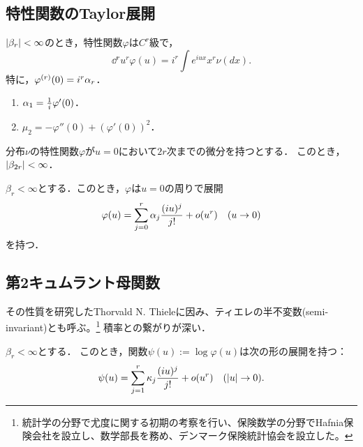 \documentclass[uplatex,dvipdfmx]{jsreport}
\begin{document}
\subsection{特性関数のTaylor展開}

\begin{proposition}
    $\lvert\beta_r\rvert<\infty$のとき，特性関数$\varphi$は$C^r$級で，
    \[\dd{^r}{u^r}\varphi(u)=i^r\int e^{iux}x^r\nu(dx).\]
    特に，$\varphi^{(r)}(0)=i^r\alpha_r$．
\end{proposition}

\begin{corollary}[平均と分散の特性関数による特徴付け]\mbox{}\label{cor-mean-and-variance-in-terms-of-characteristic-function}
    \begin{enumerate}
        \item $\alpha_1=\frac{1}{i}\varphi'(0)$．
        \item $\mu_2=-\varphi''(0)+(\varphi'(0))^2$．
    \end{enumerate}
\end{corollary}

\begin{proposition}
    分布$\nu$の特性関数$\varphi$が$u=0$において$2r$次までの微分を持つとする．
    このとき，$\lvert\beta_{2r}\rvert<\infty$．
\end{proposition}

\begin{proposition}
    $\beta_r<\infty$とする．このとき，$\varphi$は$u=0$の周りで展開
    \[\varphi(u)=\sum^r_{j=0}\alpha_j\frac{(iu)^j}{j!}+o(u^r)\quad(u\to0)\]
    を持つ．
\end{proposition}

\subsection{第2キュムラント母関数}

\begin{tcolorbox}[colframe=ForestGreen, colback=ForestGreen!10!white,breakable,colbacktitle=ForestGreen!40!white,coltitle=black,fonttitle=\bfseries\sffamily,
title=]
    その性質を研究したThorvald N. Thieleに因み、ティエレの半不変数(semi-invariant)とも呼ぶ。\footnote{統計学の分野で尤度に関する初期の考察を行い、保険数学の分野でHafnia保険会社を設立し、数学部長を務め、デンマーク保険統計協会を設立した。}
    積率との繋がりが深い．
\end{tcolorbox}

\begin{proposition}
    $\beta_r<\infty$とする．
    このとき，関数$\psi(u):=\log\varphi(u)$は次の形の展開を持つ：
    \[\psi(u)=\sum^r_{j=1}\kappa_j\frac{(iu)^j}{j!}+o(u^r)\quad(\lvert u\rvert\to0).\]
\end{proposition}
\end{document}
